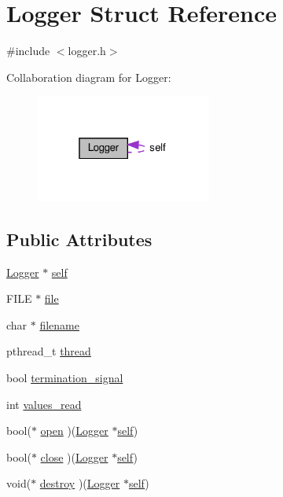 \hypertarget{structLogger}{}\section{Logger Struct Reference}
\label{structLogger}


{\ttfamily \#include $<$logger.\+h$>$}



Collaboration diagram for Logger\+:
\nopagebreak
\begin{figure}[H]
\begin{center}
\leavevmode
\includegraphics[width=163pt]{structLogger__coll__graph}
\end{center}
\end{figure}
\subsection*{Public Attributes}
\begin{DoxyCompactItemize}
\item 
\hyperlink{structLogger}{Logger} $\ast$ \hyperlink{structLogger_a220cd94b89be365dba07df9cbdf2d15f}{self}
\item 
F\+I\+LE $\ast$ \hyperlink{structLogger_ad00c914c1f38de6d069cb788b9074d8f}{file}
\item 
char $\ast$ \hyperlink{structLogger_a4a7913dbecc583e935e8c18ec62716ab}{filename}
\item 
pthread\+\_\+t \hyperlink{structLogger_a69e132f8b832286f2bfd777d0a6bc266}{thread}
\item 
bool \hyperlink{structLogger_af3c673bf2d3f729549722c0beab4f34c}{termination\+\_\+signal}
\item 
int \hyperlink{structLogger_aa5a4930df402c7b25487a1315b9a94f4}{values\+\_\+read}
\item 
bool($\ast$ \hyperlink{structLogger_ab614de252dd023fdf6b92a048897c25c}{open} )(\hyperlink{structLogger}{Logger} $\ast$\hyperlink{structLogger_a220cd94b89be365dba07df9cbdf2d15f}{self})
\item 
bool($\ast$ \hyperlink{structLogger_a74d2694f55a84cc00935fd090e9af86d}{close} )(\hyperlink{structLogger}{Logger} $\ast$\hyperlink{structLogger_a220cd94b89be365dba07df9cbdf2d15f}{self})
\item 
void($\ast$ \hyperlink{structLogger_a710869ca085596ec9e08fc37303af982}{destroy} )(\hyperlink{structLogger}{Logger} $\ast$\hyperlink{structLogger_a220cd94b89be365dba07df9cbdf2d15f}{self})
\end{DoxyCompactItemize}


